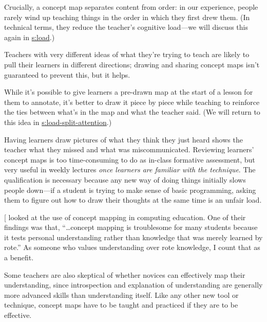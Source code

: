 \begin{description}
\tightlist
\item[Helping teachers figure out what they're trying to teach.]
Crucially, a concept map separates content from order: in our
experience, people rarely wind up teaching things in the order in
which they first drew them. (In technical terms, they reduce the
teacher's cognitive load---we will discuss this again in
\protect\hyperlink{CHAPTER}{s:load}.)
\item[Aiding communication between lesson designers.]
Teachers with very different ideas of what they're trying to teach
are likely to pull their learners in different directions; drawing
and sharing concept maps isn't guaranteed to prevent this, but it
helps.
\item[Aiding communication with learners.]
While it's possible to give learners a pre-drawn map at the start of
a lesson for them to annotate, it's better to draw it piece by piece
while teaching to reinforce the ties between what's in the map and
what the teacher said. (We will return to this idea in
\protect\hyperlink{SECTION}{s:load-split-attention}.)
\item[For assessment.]
Having learners draw pictures of what they think they just heard
shows the teacher what they missed and what was miscommunicated.
Reviewing learners' concept maps is too time-consuming to do as
in-class formative assessment, but very useful in weekly lectures
\emph{once learners are familiar with the technique}. The qualification
is necessary because any new way of doing things initially slows
people down---if a student is trying to make sense of basic
programming, asking them to figure out how to draw their thoughts at
the same time is an unfair load.
\end{description}

{[}\protect[\hyperlink{b:Kepp2008}{Kepp2008}]{]} looked at the use of concept mapping in computing
education. One of their findings was that, ``\ldots{}concept
mapping is troublesome for many students because it tests personal
understanding rather than knowledge that was merely learned by rote.'' As
someone who values understanding over rote knowledge, I count that as a
benefit.

Some teachers are also skeptical of whether novices can effectively map
their understanding, since introspection and explanation of
understanding are generally more advanced skills than understanding
itself. Like any other new tool or technique, concept maps have to be
taught and practiced if they are to be effective.

